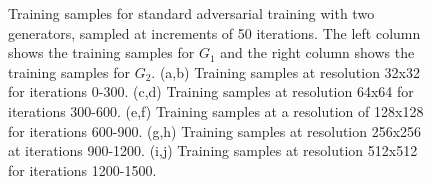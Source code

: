 \begin{figure}[!htbp]
    \hfill
    \hfill
    \hfill
    \hfill
    \hfill
    \caption[Training samples for standard adversarial training with two generators]{Training samples for standard adversarial training with two generators, sampled at increments of 50 iterations. The left column shows the training samples for $G_{1}$ and the right column shows the training samples for $G_{2}$. (a,b) Training samples at resolution 32x32 for iterations 0-300. (c,d) Training samples at resolution 64x64 for iterations 300-600. (e,f) Training samples at a resolution of 128x128 for iterations 600-900. (g,h) Training samples at resolution 256x256 at iterations 900-1200. (i,j) Training samples at resolution 512x512 for iterations 1200-1500.}
    \label{fig:c3:samples-no-col-var}
  \end{figure}

